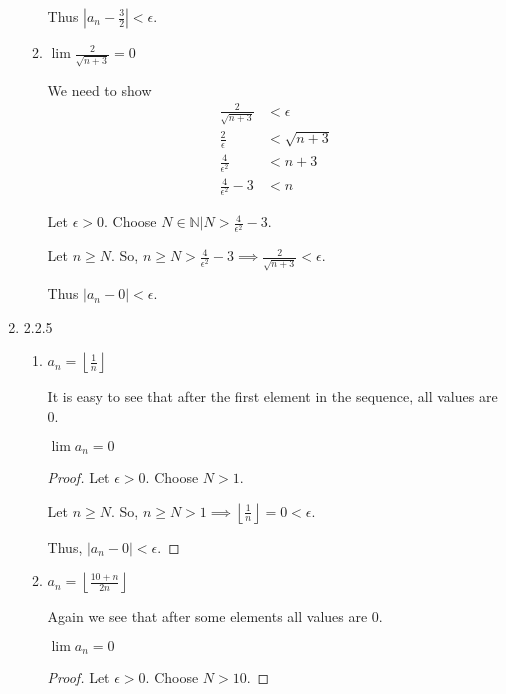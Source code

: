 \documentclass[12pt,letterpaper]{article}
\begin{document}
\begin{enumerate}
\begin{enumerate}
          Thus $|a_n - \frac{3}{2}| < \epsilon$.

        \item
          $\lim \frac{2}{\sqrt{n + 3}} = 0$

          We need to show
          \begin{align*}
            \frac{2}{\sqrt{n + 3}} &< \epsilon \\
            \frac{2}{\epsilon} &< \sqrt{n + 3} \\
            \frac{4}{\epsilon^2} &< n + 3 \\
            \frac{4}{\epsilon^2} - 3 &< n
          \end{align*}

          Let $\epsilon > 0$.
          Choose $N \in \mathbb{N} | N > \frac{4}{\epsilon^2} - 3$.

          Let $n \ge N$.
          So, $n \ge N > \frac{4}{\epsilon^2} - 3 \implies \frac{2}{\sqrt{n + 3}} < \epsilon$.

          Thus $|a_n - 0| < \epsilon$.
      \end{enumerate}

    \item 2.2.5
      \begin{enumerate}
        \item
          $a_n = \left\lfloor\frac{1}{n}\right\rfloor$

          It is easy to see that after the first element in the sequence,
          all values are $0$.

          $\lim a_n = 0$

          \begin{proof}
            Let $\epsilon > 0$.
            Choose $N > 1$.

            Let $n \ge N$.
            So, $n \ge N > 1 \implies \left\lfloor\frac{1}{n}\right\rfloor = 0 < \epsilon$.

            Thus, $|a_n - 0| < \epsilon$.
          \end{proof}

        \item
          $a_n = \left \lfloor \frac{10 + n}{2n} \right \rfloor$

          Again we see that after some elements all values are $0$.

          $\lim a_n = 0$

          \begin{proof}
            Let $\epsilon > 0$.
            Choose $N > 10$.


\end{proof}
\end{enumerate}
\end{enumerate}
\end{document}
